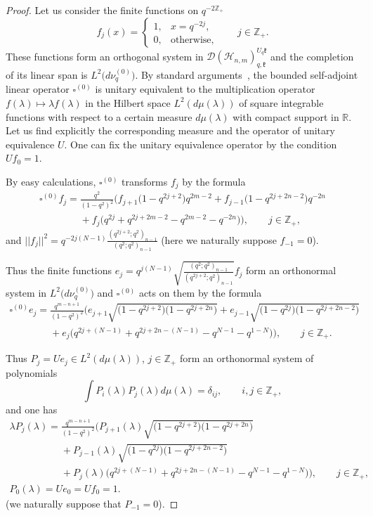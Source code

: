 \begin{proof} Let us consider the f\/inite functions on $q^{-2\mathbb Z_+}$
\[
f_j(x)=
\begin{cases} 1, & x=q^{-2j},\\ 0, & \text{otherwise}, \end{cases}
\qquad j \in \mathbb Z_+.
\]
These functions form an orthogonal system in $\mathscr{D}(\mathscr{H}_{n,m})_{q,\mathfrak{k}}^{U_q \mathfrak{k}}$
and the completion of its linear span is $L^2\big(d\nu_q^{(0)}\big)$. By standard arguments~\cite{AG}, the bounded
self-adjoint linear operator $\square^{(0)}$ is unitary equivalent to the multiplication operator $f(\lambda)
\mapsto \lambda f(\lambda)$ in the Hilbert space $L^2(d\mu(\lambda))$ of square integrable functions with
respect to a certain measure $d\mu(\lambda)$ with compact support in $\mathbb R$. Let us f\/ind explicitly the
corresponding measure and the operator of unitary equivalence $U$. One can f\/ix the unitary equivalence
operator by the condition $Uf_0=1$.

By easy calculations, $\square^{(0)}$ transforms $f_j$ by the formula
\begin{gather*}
\square^{(0)}f_j=\frac{q^2}{(1-q^2)^2} \big( f_{j+1}\big(1-q^{2j+2}\big)q^{2m-2}+f_{j-1}\big(1-q^{2j+2n-2}\big)q^{-2n}\\
\phantom{\square^{(0)}f_j=}{} +f_j
\big(q^{2j}+q^{2j+2m-2}-q^{2m-2}-q^{-2n}\big)\big), \qquad j \in \mathbb Z_+,
\end{gather*}
and $||f_j||^2=q^{-2j(N-1)}\frac{(q^{2j+2};q^2)_{n-1}}{(q^2;q^2)_{n-1}}$ (here we naturally suppose
$f_{-1}=0$).

{\sloppy Thus the f\/inite functions $e_j=q^{j(N-1)}\sqrt{\frac{(q^{2};q^2)_{n-1}}{(q^{2j+2};q^2)_{n-1}}}f_j$ form an
orthonormal system in $L^2\big(d\nu_q^{(0)}\big)$ and $\square^{(0)}$ acts on them by the formula
\begin{gather*}
\square^{(0)}e_j=\frac{q^{m-n+1}}{(1-q^2)^2}\Big(
e_{j+1}\sqrt{\big(1-q^{2j+2}\big)\big(1-q^{2j+2n}\big)}+e_{j-1}\sqrt{\big(1-q^{2j}\big)\big(1-q^{2j+2n-2}\big)} \\
\phantom{\square^{(0)}e_j=}{}+e_j
\big(q^{2j+(N-1)}+q^{2j+2n-(N-1)}-q^{N-1}-q^{1-N}\big)\Big), \qquad j \in \mathbb Z_+.
\end{gather*}

}

Thus $P_j=Ue_j \in L^2(d\mu(\lambda))$, $j\in\mathbb{Z}_+$ form an orthonormal system of polynomials
\[
\int P_i(\lambda)P_j(\lambda)d\mu(\lambda)=\delta_{ij},\qquad i,j\in\mathbb{Z}_+,
\]
and one has{\samepage
\begin{gather}
\lambda P_j(\lambda)= \frac{q^{m-n+1}}{(1-q^2)^2}
\Big(P_{j+1}(\lambda)\sqrt{\big(1-q^{2j+2}\big)\big(1-q^{2j+2n}\big)}\nonumber\\
\phantom{\lambda P_j(\lambda)=}{}
 +P_{j-1} (\lambda) \sqrt{\big(1-q^{2j}\big)
\big(1-q^{2j+2n-2}\big)}\nonumber\\
\phantom{\lambda P_j(\lambda)=}{}
+P_j(\lambda) \big(q^{2j+(N-1)}+q^{2j+2n-(N-1)}-q^{N-1}-q^{1-N}\big)\Big), \qquad j \in \mathbb Z_+,\label{P_rec}
\\
\label{init_P0}
P_0(\lambda)=Ue_0=Uf_0=1.
\end{gather}
(we naturally suppose that $P_{-1}=0$).}


\end{proof}
